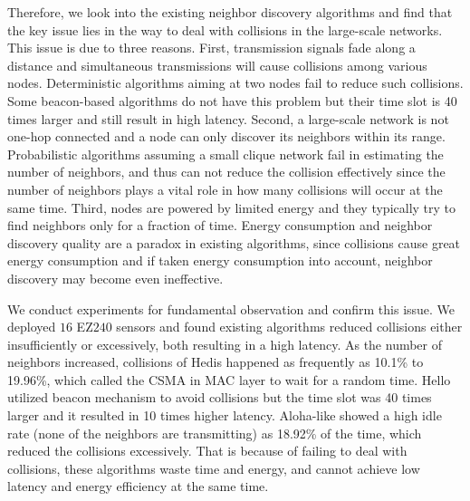 Therefore, we look into the existing neighbor discovery algorithms and find that the key issue lies in the way to deal with collisions in the large-scale networks. %
This issue is due to three reasons.
First, transmission signals fade along a distance and simultaneous transmissions will cause collisions among various nodes. Deterministic algorithms aiming at two nodes \cite{kandhalu2010u, chen2015heterogeneous} fail to reduce such collisions. Some beacon-based algorithms \cite{dutta2008practical, bakht2012searchlight, sun2014hello, qiu2016talk} do not have this problem but their time slot is 40 times larger \cite{kandhalu2010u} and still result in high latency. 
Second, a large-scale network is not one-hop connected and a node can only discover its neighbors within its range. Probabilistic algorithms \cite{vasudevan2009neighbor, you2011aloha, song2014probabilistic} assuming a small clique network fail in estimating the number of neighbors, and thus can not reduce the collision effectively since the number of neighbors plays a vital role in how many collisions will occur at the same time. 
Third, nodes are powered by limited energy and they typically try to find neighbors only for a fraction of time. Energy consumption and neighbor discovery quality are a paradox in existing algorithms, since collisions cause great energy consumption and if taken energy consumption into account, neighbor discovery may become even ineffective.

We conduct experiments for fundamental observation and confirm this issue. We deployed $16$ EZ$240$ sensors \cite{huang2012easipled} and found existing algorithms reduced collisions either insufficiently or excessively, both resulting in a high latency.
As the number of neighbors increased, collisions of Hedis \cite{chen2015heterogeneous} happened as frequently as 10.1\% to 19.96\%, which called the CSMA \cite{bianchi1996performance} in MAC layer to wait for a random time. Hello \cite{sun2014hello} utilized beacon mechanism to avoid collisions but the time slot was 40 times larger and it resulted in 10 times higher latency.  Aloha-like \cite{you2011aloha} showed a high idle rate (none of the neighbors are transmitting) as 18.92\% of the time, which reduced the collisions excessively.  %
That is because of failing to deal with collisions, these algorithms waste time and energy, and cannot achieve low latency and energy efficiency at the same time.

